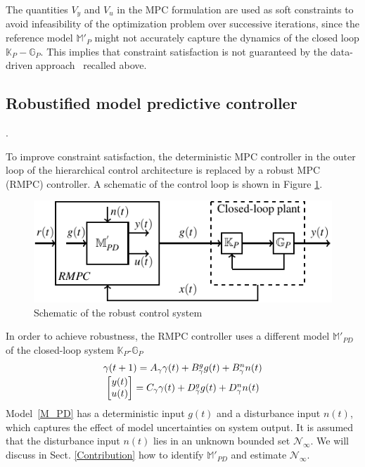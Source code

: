\documentclass[letterpaper, 10 pt, conference]{ieeeconf}  %
\newcommand{\AB}[1]{\textbf{\color{magenta}{[AB: #1]}}}
\begin{document}
	\normalsize
	The quantities $V_y$ and $V_u$ in the MPC formulation are used as soft constraints to avoid infeasibility of the optimization problem over successive iterations, since the reference model $\mathbb{M}'_P$ might not accurately capture the dynamics of the closed loop $\mathbb{K}_P-\mathbb{G}_P$. This implies that constraint satisfaction is not guaranteed by the data-driven approach~\cite{7932940} recalled above. 
	
	\subsection{Robustified model predictive controller}
\AB{I changed the formulation completely, I suspect the previous one was not correct}.

	To improve constraint satisfaction, the deterministic MPC controller in the outer loop of the hierarchical control architecture is replaced by a robust MPC (RMPC) controller. A schematic of the control loop is shown in Figure \ref{fullloop}. 
	\begin{figure}[t]
		\vspace{-3pt}
		\hspace{20pt}
		\includegraphics[scale = 0.9]{final_robust.pdf}
		\caption{Schematic of the robust control system}
		\label{fullloop}
	\end{figure} 
	
	In order to achieve robustness, the RMPC controller uses a different model $\mathbb{M}'_{PD}$ of the closed-loop system $\mathbb{K}_P$-$\mathbb{G}_P$
	\begin{equation}
	\begin{matrix}
	\gamma(t+1) = A_\gamma\gamma(t) + B^g_\gamma g(t) + B^n_\gamma n(t) \vspace{2pt}\\
	\begin{bmatrix}y(t)\\u(t)\end{bmatrix} = C_\gamma\gamma(t) + D^g_\gamma g(t) + D^n_\gamma n(t)
	\end{matrix}
	\label{M_PD}
	\end{equation}
Model~\eqref{M_PD} has a deterministic input $g(t)$ and a disturbance input $n(t)$, which captures the effect of model uncertainties on system output. It is assumed that the disturbance input $n(t)$ lies in an unknown bounded set $\mathcal{N}_{\infty}$.
We will discuss in Sect. \ref{Contribution}
how to identify $\mathbb{M}'_{PD}$ and estimate $\mathcal{N}_{\infty}$.
\end{document}
